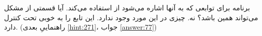 \section{}
\paragraph{}\label{hint:219}
برنامه برای توابعی که به آنها اشاره می‌شود از  استفاده می‌کند. آیا قسمتی از مشکل می‌تواند همین باشد؟ نه. چیزی در این مورد وجود ندارد.  این تابع را به خوبی تحت کنترل دارد. (راهنماییِ بعدی \ref{hint:271}، جواب \ref{answer:77})